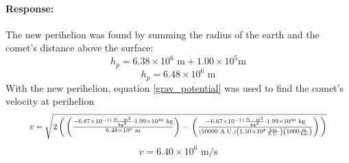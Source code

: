 \documentclass[12pt]{article}
\begin{document}
	\paragraph{Response:}
		The new perihelion was found by summing the radius of the earth and the comet's distance above the surface:
		$$ h_p = 6.38 \times 10^6\text{ m} + 1.00 \times 10^5\text{m} $$
		$$ h_p = 6.48 \times 10^6\text{ m} $$
		With the new perihelion, equation \ref{grav_potential} was used to find the comet's velocity at perihelion
		\begin{equation*}
			\resizebox{0.9\textwidth}{!}
				{%
					$ v = \sqrt{2\\
					\left(\\
					\left(\\
					\frac{-6.67 \times 10^{-11}\frac{\text{N } \cdot \text{ m}^2}{\text{kg}^2} \cdot 1.99 \times 10^{30} \text{ kg}}{6.48 \times 10^6\text{ m}}\\
					\right) -\\
					\left(\\
					\frac{-6.67 \times 10^{-11}\frac{\text{N } \cdot \text{ m}^2}{\text{kg}^2} \cdot 1.99 \times 10^{30} \text{ kg}}{(50000 \text{ A.U.})\left(1.50 \times 10^8 \frac{\text{km}}{\text{A.U.}}\right)\left(1000 \frac{\text{m}}{\text{km}}\right)}\\ 
					\right)\\
					\right)}$%
				}
		\end{equation*}
		$$ v = 6.40 \times 10^6 \text{ m/s} $$
\end{document}
